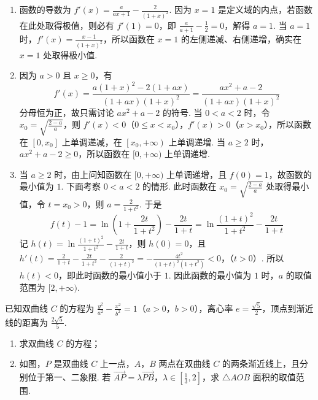 \begin{solution}
\begin{enumerate}
\item 函数的导数为 \(f'\left(x\right)=\frac{a}{ax+1}-\frac{2}{\left(1+x\right)^{2}}\). 因为 \(x=1\) 是定义域的内点，若函数在此处取得极值，则必有 \(f'\left(1\right)=0\)，即 \(\frac{a}{a+1}-\frac{1}{2}=0\)，解得 \(a=1\). 当 \(a=1\) 时，\(f'\left(x\right)=\frac{x-1}{\left(1+x\right)^{2}}\)，所以函数在 \(x=1\) 的左侧递减、右侧递增，确实在 \(x=1\) 处取得极小值.
\item 因为 \(a>0\) 且 \(x\geqslant0\)，有
\[
f'\left(x\right)=\frac{a\left(1+x\right)^{2}-2\left(1+ax\right)}{\left(1+ax\right)\left(1+x\right)^{2}}=\frac{ax^{2}+a-2}{\left(1+ax\right)\left(1+x\right)^{2}}
\]
分母恒为正，故只需讨论 \(ax^{2}+a-2\) 的符号. 当 \(0<a<2\) 时，令 \(x_{0}=\sqrt{\frac{2-a}{a}}\)，则 \(f'\left(x\right)<0\)（\(0\leqslant x<x_{0}\)），\(f'\left(x\right)>0\)（\(x>x_{0}\)），所以函数在 \(\left[0,x_{0}\right]\) 上单调递减，在 \(\left[x_{0},+\infty\right)\) 上单调递增. 当 \(a\geqslant2\) 时，\(ax^{2}+a-2\geqslant0\)，所以函数在 \([0,+\infty)\) 上单调递增.
\item 当 \(a\geqslant2\) 时，由上问知函数在 \([0,+\infty)\) 上单调递增，且 \(f\left(0\right)=1\)，故函数的最小值为 \(1\). 下面考察 \(0<a<2\) 的情形. 此时函数在 \(x_{0}=\sqrt{\frac{2-a}{a}}\) 处取得最小值，令 \(t=x_{0}>0\)，则 \(a=\frac{2}{1+t^{2}}\). 于是
\[
f\left(t\right)-1=\ln\left(1+\frac{2t}{1+t^{2}}\right)-\frac{2t}{1+t}=\ln\frac{\left(1+t\right)^{2}}{1+t^{2}}-\frac{2t}{1+t}
\]
记 \(h\left(t\right)=\ln\frac{\left(1+t\right)^{2}}{1+t^{2}}-\frac{2t}{1+t}\)，则 \(h\left(0\right)=0\)，且
\(h'\left(t\right)=\frac{2}{1+t}-\frac{2t}{1+t^{2}}-\frac{2}{\left(1+t\right)^{2}}=-\frac{4t^{2}}{\left(1+t\right)^{2}\left(1+t^{2}\right)}<0\)，（\(t>0\)）.
所以 \(h\left(t\right)<0\)，即此时函数的最小值小于 \(1\). 因此函数的最小值为 \(1\) 时，\(a\) 的取值范围为 \([2,+\infty)\).
\end{enumerate}
\end{solution}

\begin{problem}
已知双曲线 \(C\) 的方程为 \( \frac{y^{2}}{a^{2}} - \frac{x^{2}}{b^{2}} = 1 \)（\(a > 0\)，\(b > 0\)），离心率 \( e = \frac{\sqrt{5}}{2} \)，顶点到渐近线的距离为 \( \frac{2\sqrt{5}}{5} \).

\begin{enumerate}
\item 求双曲线 \(C\) 的方程；
\item 如图，\(P\) 是双曲线 \(C\) 上一点，\(A\)，\(B\) 两点在双曲线 \(C\) 的两条渐近线上，且分别位于第一、二象限. 若 \(\overrightarrow{AP} = \lambda \overrightarrow{PB}\)，\(\lambda \in \left[\frac{1}{3}, 2\right]\)，求 \(\triangle AOB\) 面积的取值范围.
\end{enumerate}

\end{problem}

